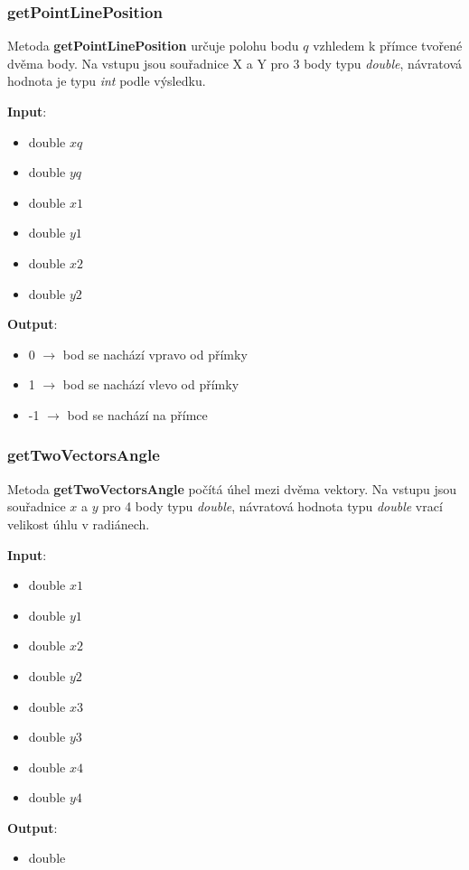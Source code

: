 \documentclass[a4paper, 12pt]{article}
\begin{document}
\subsubsection{getPointLinePosition}
Metoda \textbf{getPointLinePosition} určuje polohu bodu $q$ vzhledem k přímce tvořené dvěma body. Na vstupu jsou souřadnice X a Y pro 3 body typu \textit{double}, návratová hodnota je typu \textit{int} podle výsledku. 

\textbf{Input}:
\begin{itemize}
\item double $xq$
\item double $yq$
\item double $x1$
\item double $y1$
\item double $x2$
\item double $y2$
\end{itemize}

\textbf{Output}:
\begin{itemize}
\item 0 $\rightarrow$ bod se nachází vpravo od přímky
\item 1 $\rightarrow$ bod se nachází vlevo od přímky
\item -1 $\rightarrow$ bod se nachází na přímce
\end{itemize}

\subsubsection{getTwoVectorsAngle}
Metoda \textbf{getTwoVectorsAngle} počítá úhel mezi dvěma vektory. Na vstupu jsou souřadnice $x$ a $y$ pro 4 body typu \textit{double}, návratová hodnota typu \textit{double} vrací velikost úhlu v radiánech.

\textbf{Input}:
\begin{itemize}
\item double $x1$
\item double $y1$
\item double $x2$
\item double $y2$
\item double $x3$
\item double $y3$
\item double $x4$
\item double $y4$
\end{itemize}

\textbf{Output}:
\begin{itemize}
\item double 
\end{itemize}
\end{document}
